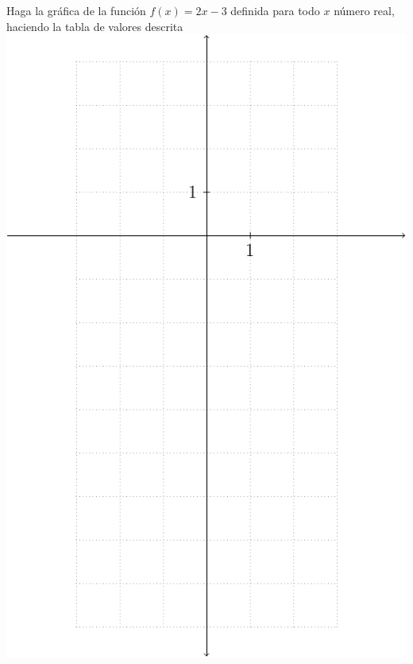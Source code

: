 \documentclass[letterpaper,10pt]{examdesign}
\begin{document}
\begin{shortanswer}
\begin{question}
Haga la gráfica de la función $f(x)=2x-3$ definida para todo $x$ número real, haciendo la tabla de valores descrita
\includegraphics[scale=1]{Images/plano.pdf} 
\end{question}
\end{shortanswer}
\end{document}
